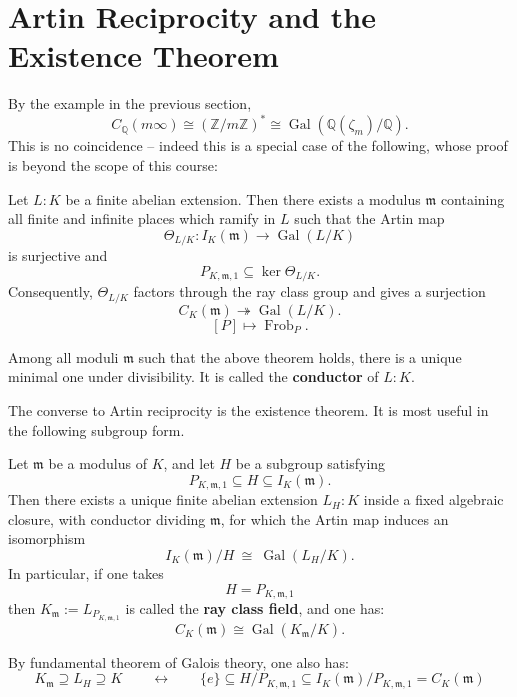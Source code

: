 \section{Artin Reciprocity and the Existence Theorem}
By the example in the previous section,
\[
C_{\mathbb Q}(m\infty)\cong(\mathbb Z/m\mathbb Z)^* \cong \operatorname{Gal}(\mathbb Q(\zeta_m)/\mathbb Q)
.
\]
This is no coincidence -- indeed this is a special case of the following, whose proof is beyond the scope of this course:
\begin{theorem}\label{thm-ArtinReciprocity}
Let $L:K$ be a finite abelian extension. Then there exists a modulus $\mathfrak m$ containing
all finite and infinite places which ramify in $L$ such that the Artin map
\[
\Theta_{L/K}:I_K(\mathfrak m)\longrightarrow\operatorname{Gal}(L/K)
\]
is surjective and
\[
P_{K,\mathfrak m,1}\subseteq\ker\Theta_{L/K}.
\]
Consequently, $\Theta_{L/K}$ factors through the ray class group and gives a surjection
\[
C_K(\mathfrak m)\twoheadrightarrow\operatorname{Gal}(L/K).
\]
\[[P] \mapsto \operatorname{Frob}_P.\]
\end{theorem}

Among all moduli $\mathfrak m$ such that the above theorem holds, there is a unique minimal one under divisibility. It is called the {\bf conductor} of $L:K$.

\medskip
The converse to Artin reciprocity is the existence theorem. It is most useful in the
following subgroup form.

\begin{theorem}\label{thm-ClassFieldExistence}
Let $\mathfrak m$ be a modulus of $K$, and let $H$ be a subgroup satisfying
\[
P_{K,\mathfrak m,1}\subseteq H\subseteq I_K(\mathfrak m).
\]
Then there exists a unique finite abelian extension $L_H:K$ inside a fixed algebraic closure,
with conductor dividing $\mathfrak m$, for which the Artin map induces an isomorphism
\[
\boxed{I_K(\mathfrak m)/H\ \cong\ \operatorname{Gal}(L_H/K).}
\]
In particular, if one takes
\[
H=P_{K,\mathfrak m,1}
\]
then $K_{\mathfrak m}:=L_{P_{K,\mathfrak m,1}}$
is called the {\bf ray class field}, and one has:
\[
C_K(\mathfrak m)\cong\operatorname{Gal}(K_{\mathfrak m}/K).
\]
\end{theorem}

By fundamental theorem of Galois theory, one also has:
$$K_{\mathfrak m} \supseteq L_H \supseteq K  \qquad \longleftrightarrow \qquad  \{e\}\subseteq H/P_{K,\mathfrak m,1}\subseteq I_K(\mathfrak m)/P_{K,\mathfrak m,1} = C_K(\mathfrak m)$$

